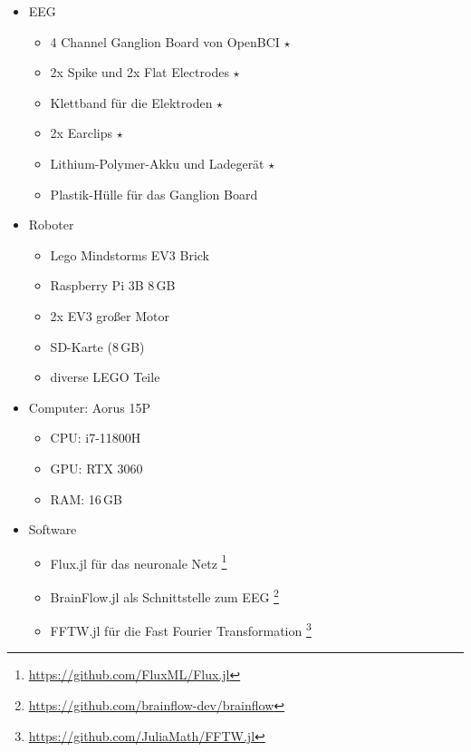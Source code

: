 \documentclass{scrartcl}
\begin{document}
	\begin{itemize}
		\item EEG
		\begin{itemize}
			\item 4 Channel Ganglion Board von OpenBCI $\star$
			\item 2x Spike und 2x Flat Electrodes  $\star$
			\item Klettband für die Elektroden $\star$
			\item 2x Earclips $\star$
			\item Lithium-Polymer-Akku und Ladegerät $\star$
			\item Plastik-Hülle für das Ganglion Board
		\end{itemize}

		\item Roboter
		\begin{itemize}
			\item Lego Mindstorms EV3 Brick
			\item Raspberry Pi 3B 8\,GB
			\item 2x EV3 großer Motor
			\item SD-Karte (8\,GB)
			\item diverse LEGO Teile
		\end{itemize}

		\item Computer: Aorus 15P
		\begin{itemize}
			\item CPU: i7-11800H
			\item GPU: RTX 3060
			\item RAM: 16\,GB
		\end{itemize}
		
		\item Software
		\begin{itemize}
			\item Flux.jl für das neuronale Netz
				\footnote{\href{https://github.com/FluxML/Flux.jl}{https://github.com/FluxML/Flux.jl}}
				\cite{Flux.jl-2018}
				\cite{innes:2018}
			
			\item BrainFlow.jl als Schnittstelle zum EEG
				\footnote{\href{https://github.com/brainflow-dev/brainflow}{https://github.com/brainflow-dev/brainflow}}
				\cite{brainflow}
			
			\item FFTW.jl für die Fast Fourier Transformation
				\footnote{\href{https://github.com/JuliaMath/FFTW.jl}{https://github.com/JuliaMath/FFTW.jl}}
				\cite{FFTW.jl-2005}
			

\end{itemize}
\end{itemize}
\end{document}
